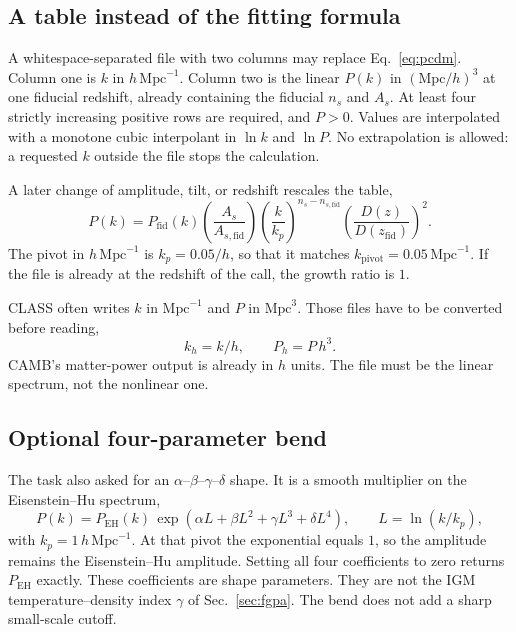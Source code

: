 \documentclass[11pt]{article}
\begin{document}
\subsection{A table instead of the fitting formula}

A whitespace-separated file with two columns may replace Eq.~\eqref{eq:pcdm}. Column one is $k$ in $h\,\mathrm{Mpc}^{-1}$. Column two is the linear $P(k)$ in $(\mathrm{Mpc}/h)^{3}$ at one fiducial redshift, already containing the fiducial $n_s$ and $A_s$. At least four strictly increasing positive rows are required, and $P>0$. Values are interpolated with a monotone cubic interpolant in $\ln k$ and $\ln P$. No extrapolation is allowed: a requested $k$ outside the file stops the calculation.

A later change of amplitude, tilt, or redshift rescales the table,
\begin{equation}
\label{eq:table}
P(k)
=
P_\mathrm{fid}(k)
\left(\frac{A_s}{A_{s,\mathrm{fid}}}\right)
\left(\frac{k}{k_p}\right)^{n_s-n_{s,\mathrm{fid}}}
\left(\frac{D(z)}{D(z_\mathrm{fid})}\right)^{2}.
\end{equation}
The pivot in $h\,\mathrm{Mpc}^{-1}$ is $k_p = 0.05/h$, so that it matches $k_\mathrm{pivot}=0.05\,\mathrm{Mpc}^{-1}$. If the file is already at the redshift of the call, the growth ratio is $1$.

CLASS often writes $k$ in $\mathrm{Mpc}^{-1}$ and $P$ in $\mathrm{Mpc}^{3}$. Those files have to be converted before reading,
\begin{equation}
k_h = k/h, \qquad P_h = P\,h^{3}.
\end{equation}
CAMB's matter-power output is already in $h$ units. The file must be the linear spectrum, not the nonlinear one.

\subsection{Optional four-parameter bend}

The task also asked for an $\alpha$--$\beta$--$\gamma$--$\delta$ shape. It is a smooth multiplier on the Eisenstein--Hu spectrum,
\begin{equation}
\label{eq:abgd}
P(k) = P_\mathrm{EH}(k)\,
\exp\!\left(\alpha L + \beta L^{2} + \gamma L^{3} + \delta L^{4}\right),
\qquad
L = \ln(k/k_p),
\end{equation}
with $k_p = 1\,h\,\mathrm{Mpc}^{-1}$. At that pivot the exponential equals $1$, so the amplitude remains the Eisenstein--Hu amplitude. Setting all four coefficients to zero returns $P_\mathrm{EH}$ exactly. These coefficients are shape parameters. They are not the IGM temperature--density index $\gamma$ of Sec.~\ref{sec:fgpa}. The bend does not add a sharp small-scale cutoff.
\end{document}
